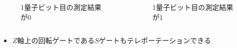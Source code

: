 \begin{frame}
  \begin{columns}
    \begin{column}{0.5\textwidth}
      \begin{figure}
        \caption{1量子ビット目の測定結果が$0$}
        \label{fig:teleportation_0}
      \end{figure}
    \end{column}
    \begin{column}{0.5\textwidth}
      \begin{figure}
        \caption{1量子ビット目の測定結果が$1$}
        \label{fig:teleportation_1}
      \end{figure}
    \end{column}
  \end{columns}
  
  \pause
  \begin{itemize}
    \item $Z$軸上の回転ゲートである$S$ゲートもテレポーテーションできる
  \end{itemize}
\end{frame}

